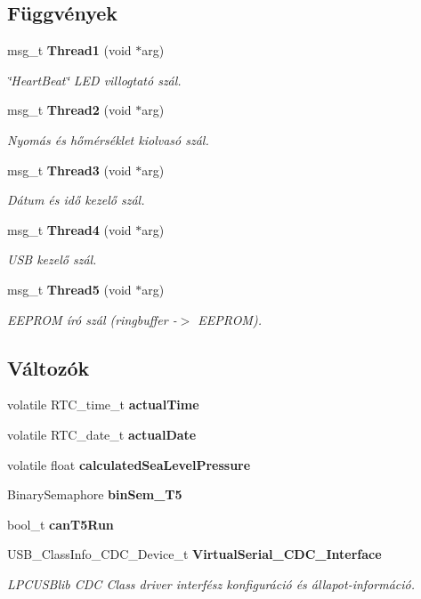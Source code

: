 \subsection*{Függvények}
\begin{DoxyCompactItemize}
\item 
msg\-\_\-t {\bf Thread1} (void $\ast$arg)
\begin{DoxyCompactList}\small\item\em \char`\"{}\-Heart\-Beat\char`\"{} L\-E\-D villogtató szál. \end{DoxyCompactList}\item 
msg\-\_\-t {\bf Thread2} (void $\ast$arg)
\begin{DoxyCompactList}\small\item\em Nyomás és hőmérséklet kiolvasó szál. \end{DoxyCompactList}\item 
msg\-\_\-t {\bf Thread3} (void $\ast$arg)
\begin{DoxyCompactList}\small\item\em Dátum és idő kezelő szál. \end{DoxyCompactList}\item 
msg\-\_\-t {\bf Thread4} (void $\ast$arg)
\begin{DoxyCompactList}\small\item\em U\-S\-B kezelő szál. \end{DoxyCompactList}\item 
msg\-\_\-t {\bf Thread5} (void $\ast$arg)
\begin{DoxyCompactList}\small\item\em E\-E\-P\-R\-O\-M író szál (ringbuffer -\/$>$ E\-E\-P\-R\-O\-M). \end{DoxyCompactList}\end{DoxyCompactItemize}
\subsection*{Változók}
\begin{DoxyCompactItemize}
\item 
volatile R\-T\-C\-\_\-time\-\_\-t {\bf actual\-Time}
\item 
volatile R\-T\-C\-\_\-date\-\_\-t {\bf actual\-Date}
\item 
volatile float {\bf calculated\-Sea\-Level\-Pressure}
\item 
Binary\-Semaphore {\bf bin\-Sem\-\_\-\-T5}
\item 
bool\-\_\-t {\bf can\-T5\-Run}
\item 
U\-S\-B\-\_\-\-Class\-Info\-\_\-\-C\-D\-C\-\_\-\-Device\-\_\-t {\bf Virtual\-Serial\-\_\-\-C\-D\-C\-\_\-\-Interface}
\begin{DoxyCompactList}\small\item\em L\-P\-C\-U\-S\-Blib C\-D\-C Class driver interfész konfiguráció és állapot-\/információ. \end{DoxyCompactList}\end{DoxyCompactItemize}


